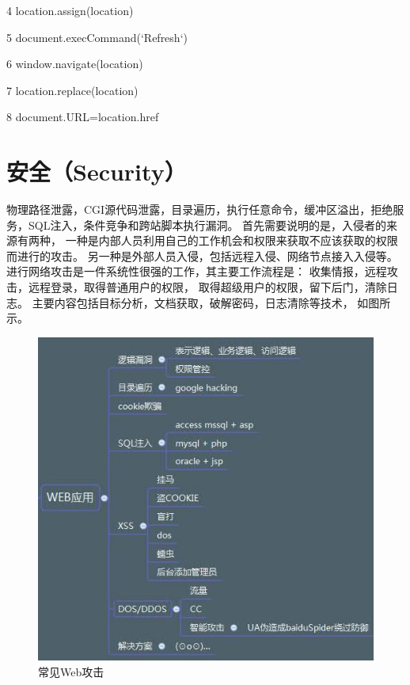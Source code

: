 \documentclass{book}
\begin{document}
4 location.assign(location)

5 document.execCommand(‘Refresh‘)

6 window.navigate(location)

7 location.replace(location)

8 document.URL=location.href


\chapter{安全（Security）}

\clearpage
\mbox{}         
\clearpage

物理路径泄露，CGI源代码泄露，目录遍历，执行任意命令，缓冲区溢出，拒绝服务，SQL注入，条件竞争和跨站脚本执行漏洞。
首先需要说明的是，入侵者的来源有两种，
一种是内部人员利用自己的工作机会和权限来获取不应该获取的权限而进行的攻击。
另一种是外部人员入侵，包括远程入侵、网络节点接入入侵等。
进行网络攻击是一件系统性很强的工作，其主要工作流程是：
收集情报，远程攻击，远程登录，取得普通用户的权限，
取得超级用户的权限，留下后门，清除日志。
主要内容包括目标分析，文档获取，破解密码，日志清除等技术，
如图所示。

\begin{figure}[htbp]
	\centering
	\includegraphics[scale=0.8]{NormalWebSecurity.jpg}
	\caption{常见Web攻击}
	\label{fig:NormalWebSecurity}
\end{figure}
\end{document}
